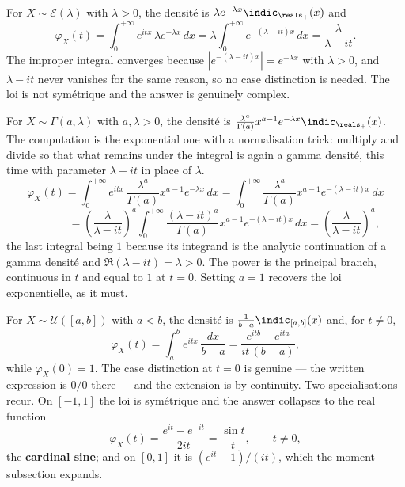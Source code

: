 \begin{example}
For $X \sim \mathcal{E}(\lambda)$ with $\lambda > 0$, the densité is $\lambda e^{-\lambda
x}\indic_{\reals_{+}}(x)$ and
\[
  \varphi_{X}(t) = \int_{0}^{+\infty} e^{itx}\,\lambda e^{-\lambda x}\,dx = \lambda
  \int_{0}^{+\infty} e^{-(\lambda - it)x}\,dx = \frac{\lambda}{\lambda - it}.
\]
The improper integral converges because $\left|e^{-(\lambda - it)x}\right| = e^{-\lambda x}$
with $\lambda > 0$, and $\lambda - it$ never vanishes for the same reason, so no case
distinction is needed. The loi is not symétrique and the answer is genuinely complex.
\end{example}

\begin{example}
For $X \sim \Gamma(a,\lambda)$ with $a, \lambda > 0$, the densité is
$\frac{\lambda^{a}}{\Gamma(a)}x^{a-1}e^{-\lambda x}\indic_{\reals_{+}}(x)$. The computation
is the exponential one with a normalisation trick: multiply and divide so that what remains
under the integral is again a gamma densité, this time with parameter $\lambda - it$ in
place of $\lambda$.
\[
  \varphi_{X}(t) = \int_{0}^{+\infty}
  e^{itx}\,\frac{\lambda^{a}}{\Gamma(a)}x^{a-1}e^{-\lambda x}\,dx = \int_{0}^{+\infty}
  \frac{\lambda^{a}}{\Gamma(a)}x^{a-1}e^{-(\lambda-it)x}\,dx
\]
\[
  \phantom{\varphi_{X}(t)} = \left(\frac{\lambda}{\lambda - it}\right)^{a}
  \int_{0}^{+\infty} \frac{(\lambda - it)^{a}}{\Gamma(a)}x^{a-1}e^{-(\lambda-it)x}\,dx =
  \left(\frac{\lambda}{\lambda - it}\right)^{a},
\]
the last integral being $1$ because its integrand is the analytic continuation of a gamma
densité and $\Re(\lambda - it) = \lambda > 0$. The power is the principal branch, continuous
in $t$ and equal to $1$ at $t = 0$. Setting $a = 1$ recovers the loi exponentielle, as it
must.
\end{example}

\begin{example}
For $X \sim \mathcal{U}([a,b])$ with $a < b$, the densité is
$\frac{1}{b-a}\indic_{[a,b]}(x)$ and, for $t \neq 0$,
\[
  \varphi_{X}(t) = \int_{a}^{b} e^{itx}\,\frac{dx}{b-a} = \frac{e^{itb} -
  e^{ita}}{it\,(b-a)},
\]
while $\varphi_{X}(0) = 1$. The case distinction at $t = 0$ is genuine --- the written
expression is $0/0$ there --- and the extension is by continuity. Two specialisations recur.
On $[-1,1]$ the loi is symétrique and the answer collapses to the real function
\[
  \varphi_{X}(t) = \frac{e^{it} - e^{-it}}{2it} = \frac{\sin t}{t}, \qquad t \neq 0,
\]
the \textbf{cardinal sine}; and on $[0,1]$ it is $\left(e^{it}-1\right)/(it)$, which the
moment subsection expands.
\end{example}

